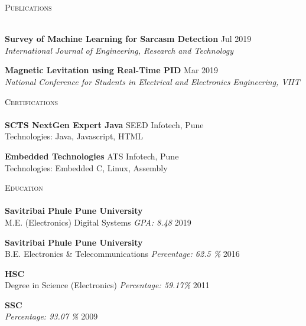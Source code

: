 \documentclass[a4paper]{article}
\newcommand{\lineunder} {
    \vspace*{-8pt} \\
    \hspace*{-18pt} \hrulefill \\
}
\newcommand{\header} [1] {
    {\hspace*{-18pt}\vspace*{6pt} \textsc{#1}}
    \vspace*{-6pt} \lineunder
}
\begin{document}
\header{Publications}
\vspace{1mm}

{\textbf{Survey of Machine Learning for Sarcasm Detection}} \hfill Jul 2019\\
\textit{International Journal of Engineering, Research and Technology} \\
\vspace*{2mm}

{\textbf{Magnetic Levitation using Real-Time PID}} \hfill Mar 2019\\
\textit{National Conference for Students in Electrical and Electronics Engineering, VIIT} \\
\vspace*{2mm}

\header{Certifications}
\vspace{1mm}
\textbf{SCTS NextGen Expert Java} \hfill SEED Infotech, Pune\\
Technologies: Java, Javascript, HTML\\
\vspace*{2mm}

\textbf{Embedded Technologies} \hfill ATS Infotech, Pune\\
Technologies: Embedded C, Linux, Assembly\\
\vspace*{2mm}

\header{Education}
\vspace{1mm}
\textbf{Savitribai Phule Pune University} \\
M.E. (Electronics) Digital Systems \textit{GPA: 8.48} \hfill  2019\\
\vspace{2mm}

\textbf{Savitribai Phule Pune University} \\
B.E. Electronics \& Telecommunications \textit{Percentage: 62.5 \%} \hfill  2016\\
\vspace{2mm}

\textbf{HSC} \\
Degree in Science (Electronics) \textit{Percentage: 59.17\%} \hfill  2011\\
\vspace{2mm}

\textbf{SSC} \\
\textit{Percentage: 93.07 \%} \hfill  2009\\
\vspace{2mm}

\ 
\end{document}
